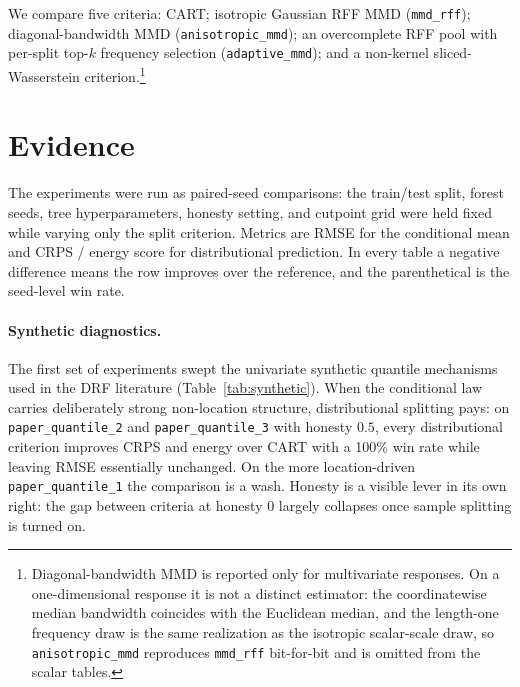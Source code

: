 \documentclass[11pt]{article}
\theoremstyle{remark}
\begin{document}
We compare five criteria: CART; isotropic Gaussian RFF MMD (\texttt{mmd\_rff});
diagonal-bandwidth MMD (\texttt{anisotropic\_mmd}); an overcomplete RFF pool with
per-split top-$k$ frequency selection (\texttt{adaptive\_mmd}); and a non-kernel
sliced-Wasserstein criterion.\footnote{Diagonal-bandwidth MMD is reported only
for multivariate responses.  On a one-dimensional response it is not a distinct
estimator: the coordinatewise median bandwidth coincides with the Euclidean
median, and the length-one frequency draw is the same realization as the
isotropic scalar-scale draw, so \texttt{anisotropic\_mmd} reproduces
\texttt{mmd\_rff} bit-for-bit and is omitted from the scalar tables.}

\section{Evidence}

The experiments were run as paired-seed comparisons: the train/test split,
forest seeds, tree hyperparameters, honesty setting, and cutpoint grid were held
fixed while varying only the split criterion.  Metrics are RMSE for the
conditional mean and CRPS / energy score for distributional prediction.  In
every table a negative difference means the row improves over the reference, and
the parenthetical is the seed-level win rate.

\paragraph{Synthetic diagnostics.}
The first set of experiments swept the univariate synthetic quantile mechanisms
used in the DRF literature (Table~\ref{tab:synthetic}).  When the conditional law
carries deliberately strong non-location structure, distributional splitting
pays: on \texttt{paper\_quantile\_2} and \texttt{paper\_quantile\_3} with honesty
$0.5$, every distributional criterion improves CRPS and energy over CART with a
100\% win rate while leaving RMSE essentially unchanged.  On the more
location-driven \texttt{paper\_quantile\_1} the comparison is a wash.  Honesty is
a visible lever in its own right: the gap between criteria at honesty $0$ largely
collapses once sample splitting is turned on.


\end{document}
